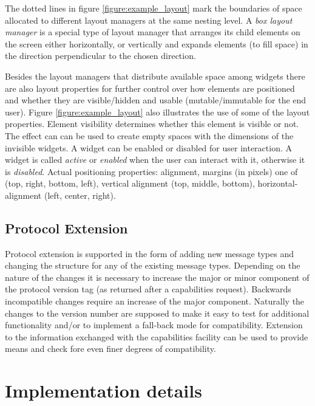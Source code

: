 \documentclass{article}
\begin{document}
    \noindent The dotted lines in figure \ref{figure:example_layout} mark the
    boundaries of space allocated to different layout managers at the same
    nesting level. A \textit{box layout manager} is a special type of layout
    manager that arranges its child elements on the screen either horizontally,
    or vertically and expands elements (to fill space) in the direction
    perpendicular to the chosen direction.
   
    Besides the layout managers that distribute available space among widgets
    there are also layout properties for further control over how elements are
    positioned and whether they are visible/hidden and usable
    (mutable/immutable for the end user).  Figure \ref{figure:example_layout}
    also illustrates the use of some of the layout properties.  Element
    visibility determines whether this element is visible or not. The effect
    can can be used to create empty spaces with the dimensions of the invisible
    widgets.  A widget can be enabled or disabled for user interaction. A
    widget is called \textit{active} or \textit{enabled} when the user can
    interact with it, otherwise it is \textit{disabled}. Actual positioning
    properties: alignment, margins (in pixels) one of (top, right, bottom,
    left), vertical alignment (top, middle, bottom), horizontal-alignment
    (left, center, right).
    
  \subsection{Protocol Extension}

   Protocol extension is supported in the form of adding new message types and
   changing the structure for any of the existing message types. Depending on
   the nature of the changes it is necessary to increase the major or minor
   component of the protocol version tag (as returned after a capabilities
   request).  Backwards incompatible changes require an increase of the major
   component. Naturally the changes to the version number are supposed to make
   it easy to test for additional functionality and/or to implement a fall-back
   mode for compatibility.  Extension to the information exchanged with the
   capabilities facility can be used to provide means and check fore even finer
   degrees of compatibility.
   

 \section{Implementation details} \label{s:protocol_implementation}
\end{document}
